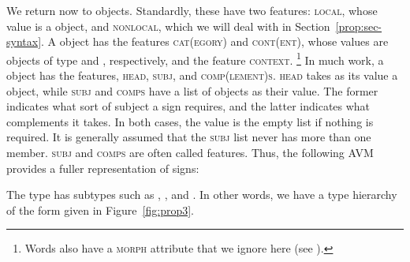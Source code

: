 \documentclass[output=paper
	        ,collection
	        ,collectionchapter
 	        ,biblatex
                ,babelshorthands
                ,newtxmath
                ,draftmode
                ,colorlinks, citecolor=brown
]{langscibook}
\begin{document}
We return now to  objects. Standardly, these have two features: \textsc{local}, whose
value is a  object, and \textsc{nonlocal}, which we will deal with in
Section~\ref{prop:sec-syntax}. A  object has the features \textsc{cat(egory)} and
\textsc{cont(ent)}, whose values are objects of type  and ,
respectively, and the feature \textsc{context}.%
%
\footnote{Words also have a \textsc{morph} attribute that we ignore here (see
  ).
}
%
In much work, a  object has the features, \textsc{head}, \textsc{subj}, and
\textsc{comp(lement)s}. \textsc{head} takes as its value a  object, while
\textsc{subj} and \textsc{comps} have a list of  objects as their value. The former
indicates what sort of subject a sign requires, and the latter indicates what complements it
takes. In both cases, the value is the empty list if nothing is required.  It is generally assumed
that the \textsc{subj} list never has more than one member. \textsc{subj} and \textsc{comps} are
often called  features.
Thus, the following AVM provides a fuller representation of signs:

\ea\label{ex:prop8}
\z

\noindent
The type  has subtypes such as , , and . In other words, we have a type hierarchy of the form given in Figure~\ref{fig:prop3}.
\end{document}
